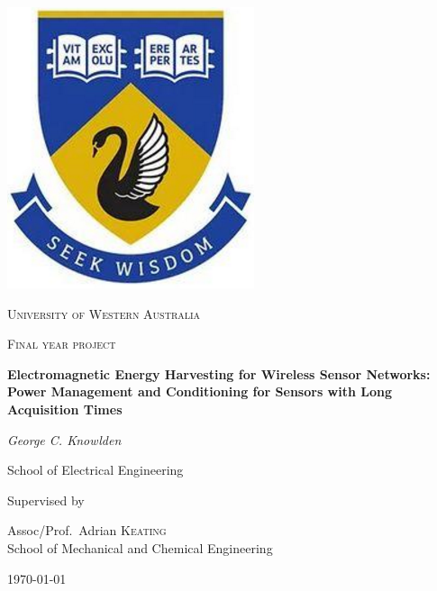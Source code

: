 \begin{titlepage}


\thispagestyle{empty}
\setlength\headheight{0pt} 
\begin{center}

\begin{center}
\includegraphics[width=0.25\linewidth]{img/uwa.PNG}            
\end{center}	

        \vspace{0.25cm}
        {\scshape\LARGE University of Western Australia \par}
        \vspace{0.25cm}
        {\scshape\Large Final year project\par}
        \vspace{0.5cm}

        {\Large\bfseries Electromagnetic Energy Harvesting for Wireless Sensor Networks: Power Management and Conditioning for Sensors with Long Acquisition Times\par}
        
        \vspace{0.5cm}
        {\Large\itshape George C. Knowlden\par}
        School of Electrical Engineering
        \vspace{0.25cm}

\vspace{1cm}
Supervised by\par
Assoc/Prof.~Adrian \textsc{Keating} \\
School of Mechanical and Chemical Engineering\par
\vspace{1.5cm}
\large
\today

\end{center}

\clearpage
\restoregeometry
\end{titlepage}
